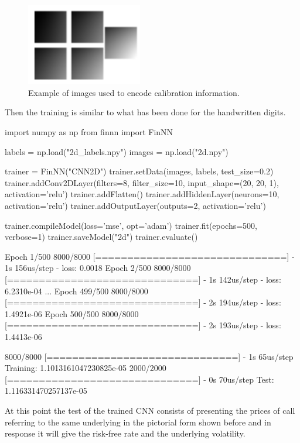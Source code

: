 \begin{figure}[htb]
\centering
\includegraphics[width=0.45\textwidth]{figures/2d_training_images}
	\caption{Example of images used to encode calibration information.}
\label{fig:test_images_calib}
\end{figure}
\noindent
Then the training is similar to what has been done for the handwritten
digits.

\begin{ipython}
import numpy as np
from finnn import FinNN

labels = np.load("2d_labels.npy")
images = np.load("2d.npy")

trainer = FinNN("CNN2D")
trainer.setData(images, labels, test_size=0.2)
trainer.addConv2DLayer(filters=8, filter_size=10,
input_shape=(20, 20, 1), activation='relu')
trainer.addFlatten()
trainer.addHiddenLayer(neurons=10, activation='relu')
trainer.addOutputLayer(outputs=2, activation='relu')

trainer.compileModel(loss='mse', opt='adam')
trainer.fit(epochs=500, verbose=1)
trainer.saveModel("2d")
trainer.evaluate()
\end{ipython}
\begin{ioutput}
Epoch 1/500
8000/8000 [==============================] - 1s 156us/step - loss: 0.0018
Epoch 2/500
8000/8000 [==============================] - 1s 142us/step - loss: 6.2310e-04
...
Epoch 499/500
8000/8000 [==============================] - 2s 194us/step - loss: 1.4921e-06
Epoch 500/500
8000/8000 [==============================] - 2s 193us/step - loss: 1.4413e-06

8000/8000 [==============================] - 1s 65us/step
Training: 1.1013161047230825e-05
2000/2000 [==============================] - 0s 70us/step
Test: 1.116331470257137e-05
\end{ioutput}

At this point the test of the trained CNN consists of presenting the prices of call
referring to the same underlying in the pictorial form shown before and
in response it will give the risk-free rate and the underlying volatility.

